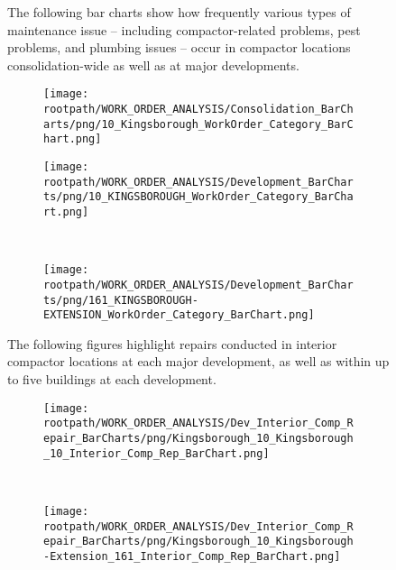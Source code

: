 \begin{figure}[h]
                                \sf
                                The following bar charts show how frequently various types of maintenance issue -- including compactor-related problems, pest problems, and plumbing issues -- occur in compactor locations consolidation-wide as well as at major developments.
                                \raggedright
                                \begin{subfigure}{\textwidth}
                                \texttt{[image: \\rootpath/WORK\_ORDER\_ANALYSIS/Consolidation\_BarCharts/png/10\_Kingsborough\_WorkOrder\_Category\_BarChart.png]}
                                \end{subfigure}
                                
                                        \begin{subfigure}{0.45\textwidth}
                                        \texttt{[image: \\rootpath/WORK\_ORDER\_ANALYSIS/Development\_BarCharts/png/10\_KINGSBOROUGH\_WorkOrder\_Category\_BarChart.png]}
                                        \end{subfigure}
                                        ~
                                        \begin{subfigure}{0.45\textwidth}
                                        \texttt{[image: \\rootpath/WORK\_ORDER\_ANALYSIS/Development\_BarCharts/png/161\_KINGSBOROUGH-EXTENSION\_WorkOrder\_Category\_BarChart.png]}
                                        \end{subfigure}
                                        
                                        \end{figure}
\begin{figure}[h]
                                \raggedright
                                \sf
                                The following figures highlight repairs conducted in interior compactor locations at each major development, as well as within up to five buildings at each development.\\
                                \begin{subfigure}{0.45\textwidth}
                                        \texttt{[image: \\rootpath/WORK\_ORDER\_ANALYSIS/Dev\_Interior\_Comp\_Repair\_BarCharts/png/Kingsborough\_10\_Kingsborough\_10\_Interior\_Comp\_Rep\_BarChart.png]}
                                        \end{subfigure}
                                        ~
                                        \begin{subfigure}{0.45\textwidth}
                                        \texttt{[image: \\rootpath/WORK\_ORDER\_ANALYSIS/Dev\_Interior\_Comp\_Repair\_BarCharts/png/Kingsborough\_10\_Kingsborough-Extension\_161\_Interior\_Comp\_Rep\_BarChart.png]}
                                        \end{subfigure}
                                        
                                        
\end{figure}
